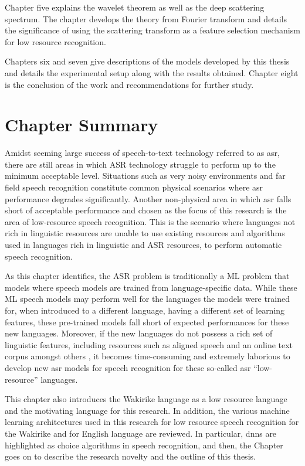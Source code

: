 Chapter five explains the wavelet theorem as well as the deep scattering spectrum. The chapter develops the theory from Fourier transform and details the significance of using the scattering transform as a feature selection mechanism for low resource recognition.  

Chapters six and seven give descriptions of the models developed by this thesis and details the experimental setup along with the results obtained. Chapter eight is the conclusion of the work and recommendations for further study. 

\section{Chapter Summary}
Amidst seeming large success of speech-to-text technology referred to as \acrfull{asr}, there are still areas in which ASR technology struggle to perform up to the minimum acceptable level.  Situations such as very noisy environments and far field speech recognition constitute common physical scenarios where \acrshort{asr} performance degrades significantly.  Another non-physical area in which \acrshort{asr} falls short of acceptable performance and chosen as the focus of this research is the area of low-resource speech recognition.  This is the scenario where languages not rich in linguistic resources are unable to use existing resources and algorithms used in languages rich in linguistic and ASR resources, to perform automatic speech recognition. 

As this chapter identifies, the ASR problem is traditionally a \acrfull{ML} problem that models where speech models are  trained from language-specific data. While these \acrshort{ML} speech models may perform well for the languages the models were trained for, when introduced to a different language, having a different set of learning features, these pre-trained models fall short of expected performances for these new languages. Moreover, if the new languages do not possess a rich set of linguistic features, including resources such as aligned speech and an online text corpus amongst others \citep{besacier2014introduction}, it becomes time-consuming and extremely laborious to develop new \acrshort{asr} models for speech recognition for these so-called \acrshort{asr} ``low-resource'' languages.

This chapter also introduces the Wakirike language as a low resource language and the motivating language for this research.  In addition, the various machine learning architectures used in this research for low resource speech recognition for the Wakirike and for English language are reviewed. In particular, \acrfull{dnns} are highlighted as choice algorithms in speech recognition, and then, the Chapter goes on to describe the research novelty and the outline of this thesis.



